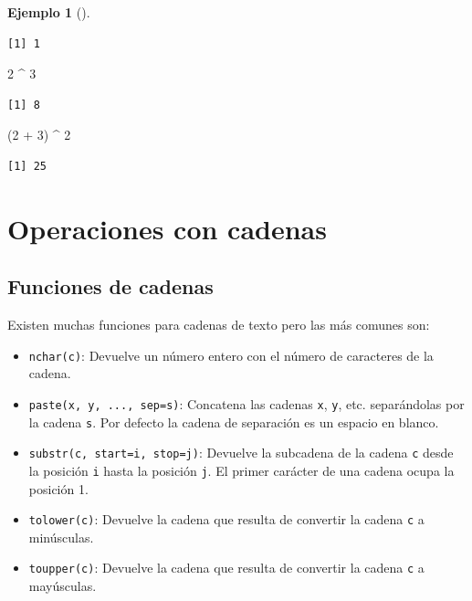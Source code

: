 \documentclass[
  a4paper,
]{scrreport}
\newenvironment{Shaded}{\begin{snugshade}}{\end{snugshade}}
\newcommand{\DecValTok}[1]{\textcolor[rgb]{0.68,0.00,0.00}{#1}}
\newcommand{\NormalTok}[1]{\textcolor[rgb]{0.00,0.23,0.31}{#1}}
\newcommand{\SpecialCharTok}[1]{\textcolor[rgb]{0.37,0.37,0.37}{#1}}
\providecommand{\tightlist}{%
  \setlength{\itemsep}{0pt}\setlength{\parskip}{0pt}}\usepackage{longtable,booktabs,array}
\theoremstyle{definition}
\newtheorem{example}{Ejemplo}[chapter]
\theoremstyle{definition}
\theoremstyle{remark}
\begin{document}
\begin{example}[]
\begin{verbatim}
[1] 1
\end{verbatim}

\begin{Shaded}
\begin{Highlighting}[]
\DecValTok{2} \SpecialCharTok{\^{}} \DecValTok{3}
\end{Highlighting}
\end{Shaded}

\begin{verbatim}
[1] 8
\end{verbatim}

\begin{Shaded}
\begin{Highlighting}[]
\NormalTok{(}\DecValTok{2} \SpecialCharTok{+} \DecValTok{3}\NormalTok{) }\SpecialCharTok{\^{}} \DecValTok{2}
\end{Highlighting}
\end{Shaded}

\begin{verbatim}
[1] 25
\end{verbatim}

\end{example}

\hypertarget{operaciones-con-cadenas}{%
\section{Operaciones con cadenas}\label{operaciones-con-cadenas}}

\hypertarget{funciones-de-cadenas}{%
\subsection{Funciones de cadenas}\label{funciones-de-cadenas}}

Existen muchas funciones para cadenas de texto pero las más comunes son:

\begin{itemize}
\tightlist
\item
  \texttt{nchar(c)}: Devuelve un número entero con el número de
  caracteres de la cadena.
\item
  \texttt{paste(x,\ y,\ ...,\ sep=s)}: Concatena las cadenas \texttt{x},
  \texttt{y}, etc. separándolas por la cadena \texttt{s}. Por defecto la
  cadena de separación es un espacio en blanco.
\item
  \texttt{substr(c,\ start=i,\ stop=j)}: Devuelve la subcadena de la
  cadena \texttt{c} desde la posición \texttt{i} hasta la posición
  \texttt{j}. El primer carácter de una cadena ocupa la posición 1.
\item
  \texttt{tolower(c)}: Devuelve la cadena que resulta de convertir la
  cadena \texttt{c} a minúsculas.
\item
  \texttt{toupper(c)}: Devuelve la cadena que resulta de convertir la
  cadena \texttt{c} a mayúsculas.
\end{itemize}
\end{document}
